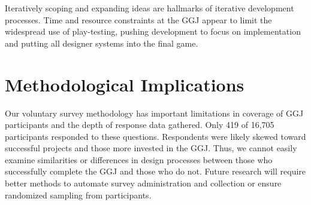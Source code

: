 \documentclass{sig-alternate}
\begin{document}
Iteratively scoping and expanding ideas are hallmarks of iterative development processes. Time and resource constraints at the GGJ appear to limit the widespread use of play-testing, pushing development to focus on implementation and putting all designer systems into the final game. 






\section{Methodological Implications}
Our voluntary survey methodology has important limitations in coverage of GGJ participants and the depth of response data gathered. Only 419 of 16,705 participants responded to these questions. Respondents were likely skewed toward successful projects and those more invested in the GGJ. Thus, we cannot easily examine similarities or differences in design processes between those who successfully complete the GGJ and those who do not. Future research will require better methods to automate survey administration and collection or ensure randomized sampling from participants.
\end{document}
